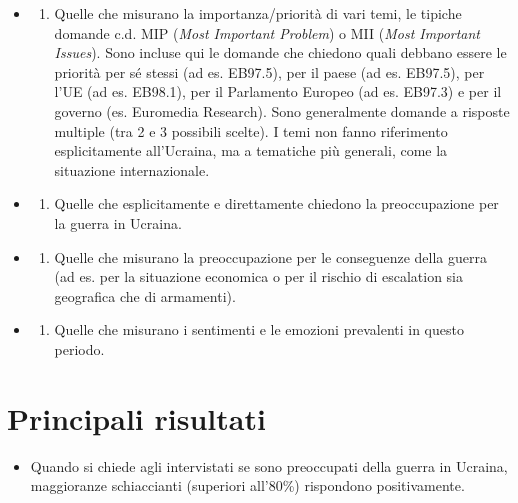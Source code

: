 \documentclass[
]{book}
\providecommand{\tightlist}{%
  \setlength{\itemsep}{0pt}\setlength{\parskip}{0pt}}
\begin{document}
\begin{itemize}
\item
  \begin{enumerate}
  \def\labelenumi{\alph{enumi})}
  \tightlist
  \item
    Quelle che misurano la importanza/priorità di vari temi, le tipiche domande c.d. MIP (\emph{Most Important Problem}) o MII (\emph{Most Important Issues}). Sono incluse qui le domande che chiedono quali debbano essere le priorità per sé stessi (ad es. EB97.5), per il paese (ad es. EB97.5), per l'UE (ad es. EB98.1), per il Parlamento Europeo (ad es. EB97.3) e per il governo (es. Euromedia Research). Sono generalmente domande a risposte multiple (tra 2 e 3 possibili scelte). I temi non fanno riferimento esplicitamente all'Ucraina, ma a tematiche più generali, come la situazione internazionale.
  \end{enumerate}
\item
  \begin{enumerate}
  \def\labelenumi{\alph{enumi})}
  \setcounter{enumi}{1}
  \tightlist
  \item
    Quelle che esplicitamente e direttamente chiedono la preoccupazione per la guerra in Ucraina.
  \end{enumerate}
\item
  \begin{enumerate}
  \def\labelenumi{\alph{enumi})}
  \setcounter{enumi}{2}
  \tightlist
  \item
    Quelle che misurano la preoccupazione per le conseguenze della guerra (ad es. per la situazione economica o per il rischio di escalation sia geografica che di armamenti).
  \end{enumerate}
\item
  \begin{enumerate}
  \def\labelenumi{\alph{enumi})}
  \setcounter{enumi}{3}
  \tightlist
  \item
    Quelle che misurano i sentimenti e le emozioni prevalenti in questo periodo.
  \end{enumerate}
\end{itemize}

\hypertarget{principali-risultati}{%
\section{Principali risultati}\label{principali-risultati}}

\begin{itemize}
\tightlist
\item
  Quando si chiede agli intervistati se sono preoccupati della guerra in Ucraina, maggioranze schiaccianti (superiori all'80\%) rispondono positivamente.
\end{itemize}
\end{document}
